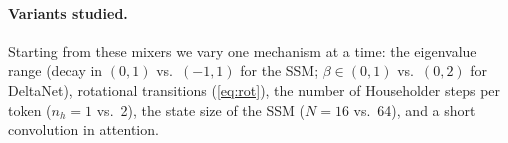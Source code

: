 \paragraph{Variants studied.} Starting from these mixers we vary one mechanism at a time: the eigenvalue
range (decay in $(0,1)$ vs.\ $(-1,1)$ for the SSM; $\beta\in(0,1)$ vs.\ $(0,2)$ for DeltaNet), rotational
transitions (\eqref{eq:rot}), the number of Householder steps per token ($n_h=1$ vs.\ 2), the state size
of the SSM ($N=16$ vs.\ 64), and a short convolution in attention.
